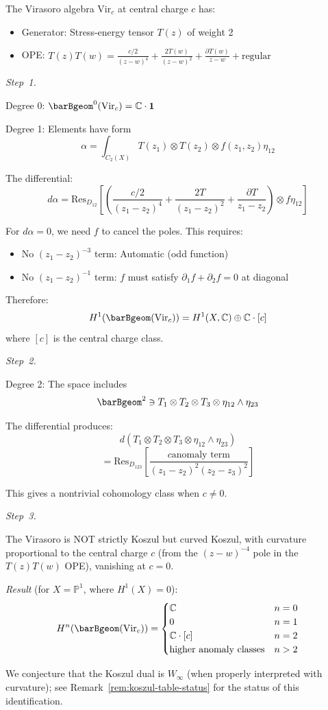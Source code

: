 \begin{example}
The Virasoro algebra $\text{Vir}_c$ at central charge $c$ has:
\begin{itemize}
\item Generator: Stress-energy tensor $T(z)$ of weight 2
\item OPE: $T(z)T(w) = \frac{c/2}{(z-w)^4} + \frac{2T(w)}{(z-w)^2} + \frac{\partial T(w)}{z-w} + \text{regular}$
\end{itemize}

\emph{Step~1.}

Degree 0: $\barBgeom^0(\text{Vir}_c) = \mathbb{C} \cdot \mathbf{1}$

Degree 1: Elements have form
\[\alpha = \int_{C_2(X)} T(z_1) \otimes T(z_2) \otimes f(z_1, z_2)\eta_{12}\]

The differential:
\[d\alpha = \text{Res}_{D_{12}}\left[\left(\frac{c/2}{(z_1-z_2)^4} + \frac{2T}{(z_1-z_2)^2} + \frac{\partial T}{z_1-z_2}\right) \otimes f\eta_{12}\right]\]

For $d\alpha = 0$, we need $f$ to cancel the poles. This requires:
\begin{itemize}
\item No $(z_1-z_2)^{-3}$ term: Automatic (odd function)
\item No $(z_1-z_2)^{-1}$ term: $f$ must satisfy $\partial_1 f + \partial_2 f = 0$ at diagonal
\end{itemize}

Therefore:
\[H^1(\barBgeom(\text{Vir}_c)) = H^1(X, \mathbb{C}) \oplus \mathbb{C} \cdot [c]\]
where $[c]$ is the central charge class.

\emph{Step~2.}

Degree 2: The space includes
\[\barBgeom^2 \ni T_1 \otimes T_2 \otimes T_3 \otimes \eta_{12} \wedge \eta_{23}\]

The differential produces:
\[d(T_1 \otimes T_2 \otimes T_3 \otimes \eta_{12} \wedge \eta_{23})\]
\[= \text{Res}_{D_{123}}\left[\frac{c \text{anomaly term}}{(z_1-z_2)^2(z_2-z_3)^2}\right]\]

This gives a nontrivial cohomology class when $c \neq 0$.

\emph{Step~3.}

The Virasoro is NOT strictly Koszul but curved Koszul, with curvature proportional to the central charge $c$ (from the $(z-w)^{-4}$ pole in the $T(z)T(w)$ OPE), vanishing at $c = 0$.

\emph{Result} (for $X = \mathbb{P}^1$, where $H^1(X) = 0$):
\[H^n(\barBgeom(\text{Vir}_c)) = \begin{cases}
\mathbb{C} & n = 0 \\
0 & n = 1 \\
\mathbb{C} \cdot [c] & n = 2 \\
\text{higher anomaly classes} & n > 2
\end{cases}\]

We conjecture that the Koszul dual is $W_\infty$ (when properly interpreted with curvature); see Remark~\ref{rem:koszul-table-status} for the status of this identification.
\end{example}

